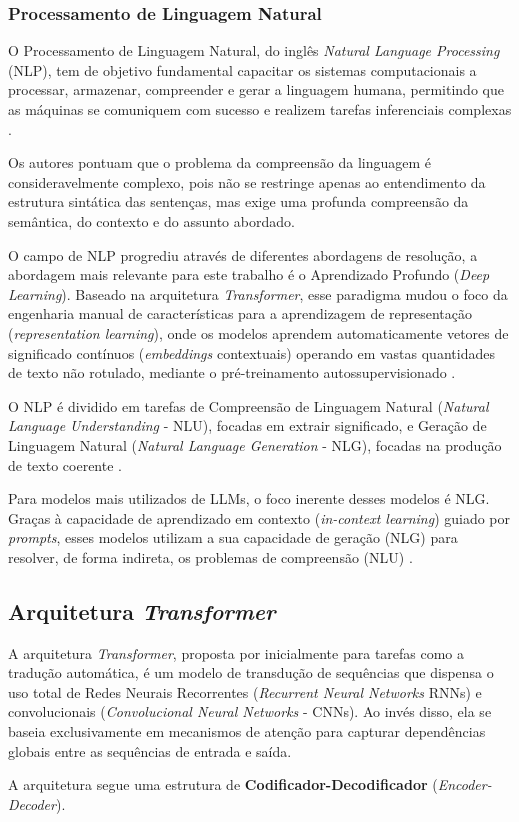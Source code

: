 \documentclass[
    12pt,                %
    openright,           %
    oneside,             %
    a4paper,             %
    english,             %
    brazil               %
]{abntex2}
\begin{document}
\begin{itemize}
\subsubsection{Processamento de Linguagem Natural}
\label{sec:processamentoln}
\par
O Processamento de Linguagem Natural, do inglês \textit{Natural Language Processing} (NLP), tem de objetivo fundamental capacitar os sistemas computacionais a processar, armazenar, compreender e gerar a linguagem humana, permitindo que as máquinas se comuniquem com sucesso e realizem tarefas inferenciais complexas \cite{jurafsky2026speech}.
\par
Os autores pontuam que o problema da compreensão da linguagem é consideravelmente complexo, pois não se restringe apenas ao entendimento da estrutura sintática das sentenças, mas exige uma profunda compreensão da semântica, do contexto e do assunto abordado.
\par
O campo de NLP progrediu através de diferentes abordagens de resolução, a abordagem mais relevante para este trabalho é o Aprendizado Profundo (\textit{Deep Learning}).
Baseado na arquitetura \textit{Transformer}, esse paradigma mudou o foco da engenharia manual de características para a aprendizagem de representação (\textit{representation learning}), onde os modelos aprendem automaticamente vetores de significado contínuos (\textit{embeddings} contextuais) operando em vastas quantidades de texto não rotulado, mediante o pré-treinamento autossupervisionado \cite{jurafsky2026speech}.
\par
O NLP é dividido em tarefas de Compreensão de Linguagem Natural (\textit{Natural Language Understanding} - NLU), focadas em extrair significado, e Geração de Linguagem Natural (\textit{Natural Language Generation} - NLG), focadas na produção de texto coerente \cite{tunstall2022natural}.
\par
Para modelos mais utilizados de LLMs, o foco inerente desses modelos é NLG.
Graças à capacidade de aprendizado em contexto (\textit{in-context learning}) guiado por \textit{prompts}, esses modelos utilizam a sua capacidade de geração (NLG) para resolver, de forma indireta, os problemas de compreensão (NLU) \cite{tunstall2022natural, jurafsky2026speech}.

\subsection{Arquitetura \textit{Transformer}}
\label{sec:modelostransformers}
\par
A arquitetura \textit{Transformer}, proposta por  inicialmente para tarefas como a tradução automática, é um modelo de transdução de sequências que dispensa o uso total de Redes Neurais Recorrentes (\textit{Recurrent Neural Networks} RNNs) e convolucionais (\textit{Convolucional Neural Networks} - CNNs).
Ao invés disso, ela se baseia exclusivamente em mecanismos de atenção para capturar dependências globais entre as sequências de entrada e saída.
\par
A arquitetura segue uma estrutura de \textbf{Codificador-Decodificador} (\textit{Encoder-Decoder}).


\end{itemize}
\end{document}
